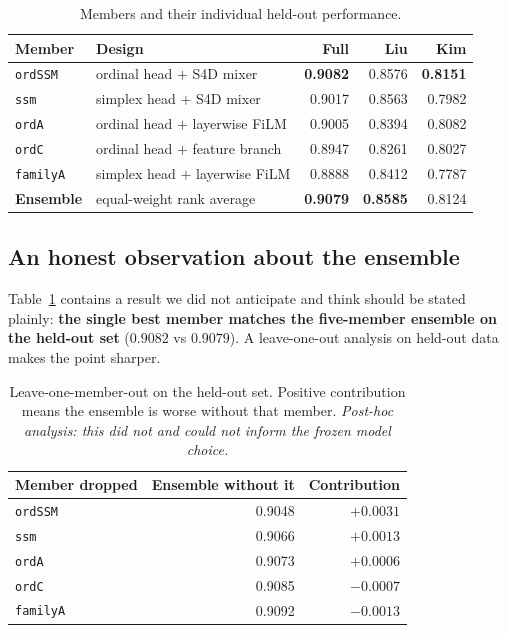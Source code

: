 \documentclass[11pt]{article}
\begin{document}
\begin{table}[H]
\centering
\caption{Members and their individual held-out performance.}
\label{tab:members}
\begin{tabular}{llrrr}
\toprule
Member & Design & Full & Liu & Kim \\
\midrule
\texttt{ordSSM} & ordinal head $+$ S4D mixer & \textbf{0.9082} & 0.8576 & \textbf{0.8151} \\
\texttt{ssm} & simplex head $+$ S4D mixer & 0.9017 & 0.8563 & 0.7982 \\
\texttt{ordA} & ordinal head $+$ layerwise FiLM & 0.9005 & 0.8394 & 0.8082 \\
\texttt{ordC} & ordinal head $+$ feature branch & 0.8947 & 0.8261 & 0.8027 \\
\texttt{familyA} & simplex head $+$ layerwise FiLM & 0.8888 & 0.8412 & 0.7787 \\
\midrule
\textbf{Ensemble} & equal-weight rank average & \textbf{0.9079} & \textbf{0.8585} & 0.8124 \\
\bottomrule
\end{tabular}
\end{table}

\subsection{An honest observation about the ensemble}
\label{sec:ens-honest}

Table~\ref{tab:members} contains a result we did not anticipate and think should be
stated plainly: \textbf{the single best member matches the five-member ensemble on the
held-out set} ($0.9082$ vs $0.9079$). A leave-one-out analysis on held-out data makes
the point sharper.

\begin{table}[H]
\centering
\caption{Leave-one-member-out on the held-out set. Positive contribution means the
ensemble is worse without that member. \emph{Post-hoc analysis: this did not and could
not inform the frozen model choice.}}
\label{tab:loo}
\begin{tabular}{lrr}
\toprule
Member dropped & Ensemble without it & Contribution \\
\midrule
\texttt{ordSSM} & 0.9048 & $+0.0031$ \\
\texttt{ssm} & 0.9066 & $+0.0013$ \\
\texttt{ordA} & 0.9073 & $+0.0006$ \\
\texttt{ordC} & 0.9085 & $-0.0007$ \\
\texttt{familyA} & 0.9092 & $-0.0013$ \\
\bottomrule
\end{tabular}
\end{table}
\end{document}

